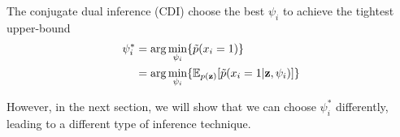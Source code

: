 The conjugate dual inference (CDI) choose the best $\psi_i$ to achieve the tightest upper-bound
\begin{align}
\psi_i^* & = \arg\min_{\psi_i} \{\Tilde{p}(x_i=1)\} \nonumber\\
& = \arg\min_{\psi_i} \{\mathbb{E}_{p(\mathbf{z})}[\Tilde{p}(x_i=1|\mathbf{z}, \psi_i)]\}
\label{eqTightBound}
\end{align}


However, in the next section, we will show that we can choose $\psi_i^*$ differently, leading to a different type of inference technique.

